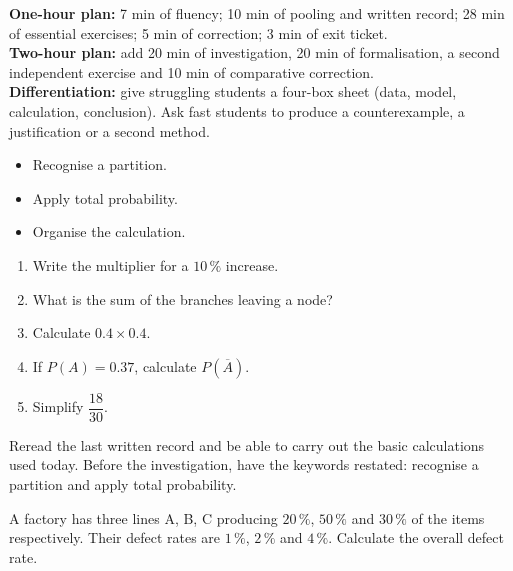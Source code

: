 \ifprof
\begin{methode}
\textbf{One-hour plan:} 7 min of fluency; 10 min of pooling and written record; 28 min of essential exercises; 5 min of correction; 3 min of exit ticket.\\
\textbf{Two-hour plan:} add 20 min of investigation, 20 min of formalisation, a second independent exercise and 10 min of comparative correction.\\
\textbf{Differentiation:} give struggling students a four-box sheet (data, model, calculation, conclusion). Ask fast students to produce a counterexample, a justification or a second method.
\end{methode}
\fi
{}
    \begin{objectifs}\begin{itemize}\item Recognise a partition.\item Apply total probability.\item Organise the calculation.\end{itemize}\end{objectifs}
    \begin{automatismes}\begin{enumerate}\item Write the multiplier for a $10\,\%$ increase. \item What is the sum of the branches leaving a node? \item Calculate $0.4\times0.4$. \item If $P(A)=0.37$, calculate $P(\overline A)$. \item Simplify $\dfrac{18}{30}$. \end{enumerate}\end{automatismes}
    \begin{prerequis}Reread the last written record and be able to carry out the basic calculations used today. Before the investigation, have the keywords restated: recognise a partition and apply total probability.\end{prerequis}

    \begin{activite}
    A factory has three lines A, B, C producing $20\,\%$, $50\,\%$ and $30\,\%$ of the items respectively. Their defect rates are $1\,\%$, $2\,\%$ and $4\,\%$. Calculate the overall defect rate.
    \begin{center}\end{center}
    \end{activite}

